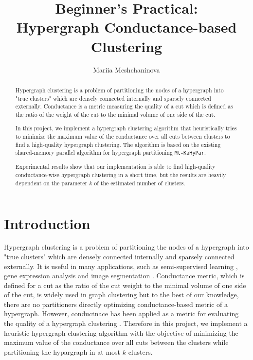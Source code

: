 \documentclass[acmsmall,nonacm,screen,review]{acmart}
\title{Beginner's Practical: \\ Hypergraph Conductance-based Clustering}
\author{Mariia Meshchaninova}
\affiliation{%
  \institution{Heidelberg University}
  \streetaddress{Im Neuenheimer Feld 205}
  \city{Heidelberg}
  \state{Baden-Württemberg}
  \country{Germany}
  \postcode{69120}
}
\date{}
\begin{document}
\begin{abstract}
Hypergraph clustering is a problem of partitioning the nodes of a 
hypergraph into "true clusters" which are densely connected internally 
and sparsely connected externally. Conductance is a metric measuring 
the quality of a cut which is defined as the ratio of the weight of 
the cut to the minimal volume of one side of the cut.

In this project, we implement a hypergraph clustering algorithm that
heuristically tries to minimize the maximum value of the conductance 
over all cuts between clusters to find a high-quality hypergraph 
clustering. The algorithm is based on the existing shared-memory 
parallel algorithm for hypergraph partitioning \texttt{Mt-KaHyPar}.

Experimental results show that our implementation is able to find
high-quality conductance-wise hypergraph clustering in a short time,
but the results are heavily dependent on the parameter $k$ of the 
estimated number of clusters.
\end{abstract}
\maketitle

\section{Introduction}
Hypergraph clustering is a problem of partitioning the nodes of a 
hypergraph into "true clusters" which are densely connected internally 
and sparsely connected externally. It is useful in many applications, 
such as semi-supervised learning \cite{ApplicationLearning}, 
gene expression analysis \cite{ApplicationGeneExpression}
and image segmentation \cite{ApplicationImageSegmentation}. 
Conductance metric, which is defined for a cut as the ratio of the cut 
weight to the minimal volume of one side of the cut, is widely used in 
graph clustering \cite{PCde, GraphConductance2006} but to the best
of our knowledge, there are no partitioners directly optimizing
conductance-based metric of a hypergraph. However, conductnace has been 
applied as a metric for evaluating the quality of a hypergraph 
clustering \cite{HyperSF}. Therefore in this project, we implement a 
heuristic hypergraph clustering algorithm with the objective of 
minimizing the maximum value of the conductance over all cuts between 
the clusters while partitioning the hypargraph in at most $k$ clusters. 
\end{document}
